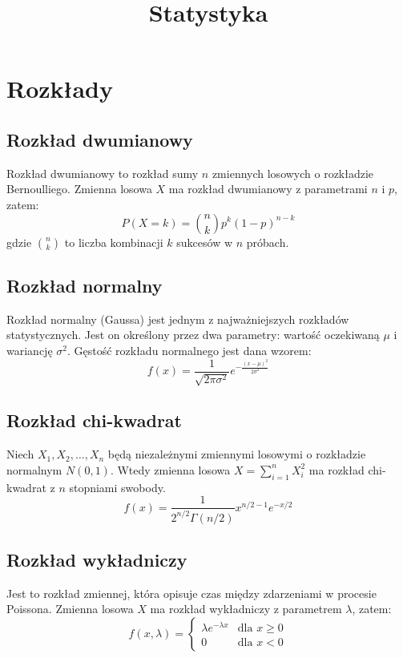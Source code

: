 \documentclass{../notatki}
\title{Statystyka}
\begin{document}
\tableofcontents

\section{Rozkłady}

\subsection{Rozkład dwumianowy}

Rozkład dwumianowy to rozkład sumy $n$ zmiennych losowych o rozkładzie
Bernoulliego. Zmienna losowa $X$ ma rozkład dwumianowy z parametrami $n$ i $p$,
zatem:
$$
P(X = k) = \binom{n}{k} p^k (1 - p)^{n-k}
$$
gdzie $\binom{n}{k}$ to liczba kombinacji $k$ sukcesów w $n$ próbach.

\subsection{Rozkład normalny}

Rozkład normalny (Gaussa) jest jednym z najważniejszych rozkładów
statystycznych. Jest on określony przez dwa parametry: wartość oczekiwaną
$\mu$ i wariancję $\sigma^2$. Gęstość rozkładu normalnego jest dana wzorem:
$$
f(x) = \frac{1}{\sqrt{2\pi\sigma^2}} e^{-\frac{(x - \mu)^2}{2\sigma^2}}
$$

\subsection{Rozkład chi-kwadrat}

Niech $X_1, X_2, \ldots, X_n$ będą niezależnymi zmiennymi losowymi o rozkładzie
normalnym $N(0, 1)$. Wtedy zmienna losowa $X = \sum_{i = 1}^{n} X_i^2$ ma
rozkład chi-kwadrat z $n$ stopniami swobody.
$$
f(x) =  \frac{1}{2^{n/2} \Gamma(n/2)} x^{n/2 - 1} e^{-x/2}
$$

\subsection{Rozkład wykładniczy}

Jest to rozkład zmiennej, która opisuje czas między zdarzeniami w procesie
Poissona. Zmienna losowa $X$ ma rozkład wykładniczy z parametrem $\lambda$,
zatem:
$$
f(x, \lambda) =
\begin{cases}
  \lambda e^{-\lambda x} & \text{dla } x \geq 0 \\
  0 & \text{dla } x < 0
\end{cases}
$$
\end{document}
